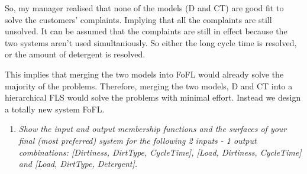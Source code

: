 \documentclass[11pt]{article}
\begin{document}
So, my manager realised that none of the models (D and CT) are good fit to solve
the customers' complaints. Implying that all the complaints are still unsolved.
It can be assumed that the complaints are still in effect because the
two systems aren't used simultaniously. So either the long cycle time is
resolved, or the amount of detergent is resolved.

This implies that merging the two models into FoFL would already solve the
majority of the problems. Therefore, merging the two models, D and CT into a
hierarchical FLS would solve the problems with minimal effort. Instead we
design a totally new system FoFL.

\begin{enumerate}[label=(\alph*)]

  \item \textit{Show the input and output membership functions and the surfaces
  of your ﬁnal (most preferred) system for the following 2 inputs - 1 output
  combinations: [Dirtiness, DirtType, CycleTime], [Load, Dirtiness, CycleTime]
  and [Load, DirtType, Detergent].}


\end{enumerate}
\end{document}
